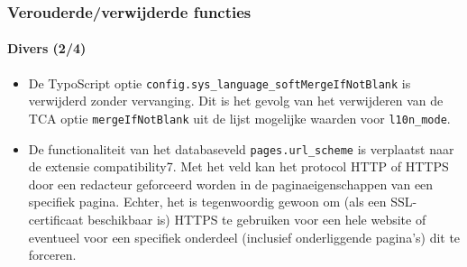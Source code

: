 \begin{frame}[fragile]
	\frametitle{Verouderde/verwijderde functies}
	\framesubtitle{Divers (2/4)}


	\begin{itemize}
		\item De TypoScript optie \texttt{config.sys\_language\_softMergeIfNotBlank}
			is verwijderd zonder vervanging. Dit is het gevolg van het verwijderen van de
			TCA optie \texttt{mergeIfNotBlank} uit de lijst mogelijke waarden voor \texttt{l10n\_mode}.

		\item De functionaliteit van het databaseveld \texttt{pages.url\_scheme} is verplaatst
			naar de extensie compatibility7. Met het veld kan het protocol HTTP of HTTPS door
			een redacteur geforceerd worden in de paginaeigenschappen van een specifiek pagina.
			Echter, het is tegenwoordig gewoon om (als een SSL-certificaat beschikbaar is) HTTPS te
			gebruiken voor een hele website of eventueel voor een specifiek onderdeel (inclusief
			onderliggende pagina's) dit te forceren.

	\end{itemize}

\end{frame}


